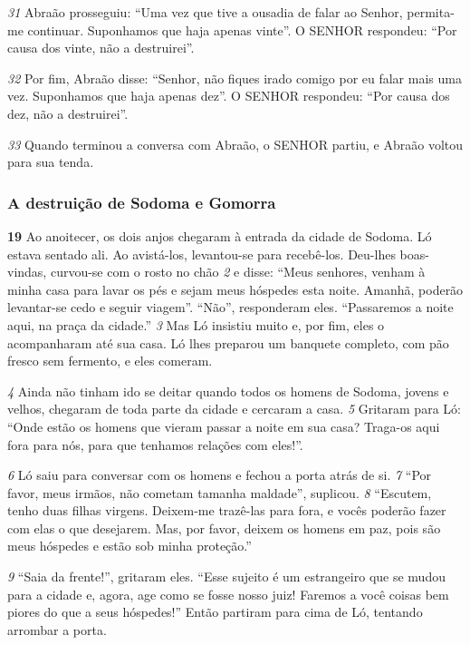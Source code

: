\bigskip   
\textit{\tiny 31}
Abraão prosseguiu: “Uma vez que tive a ousadia de falar ao Senhor, permita-
me continuar. Suponhamos que haja apenas vinte”.
   O SENHOR respondeu: “Por causa dos vinte, não a destruirei”.

\bigskip   
\textit{\tiny 32}
Por fim, Abraão disse: “Senhor, não fiques irado comigo por eu falar mais
uma vez. Suponhamos que haja apenas dez”.
   O SENHOR respondeu: “Por causa dos dez, não a destruirei”.

\bigskip   
\textit{\tiny 33}
Quando terminou a conversa com Abraão, o SENHOR partiu, e Abraão voltou
para sua tenda.
   
\bigskip   
\subsubsection*{A destruição de Sodoma e Gomorra}
\textbf{\large 19}
 Ao anoitecer, os dois anjos chegaram à entrada da cidade de Sodoma. Ló
estava sentado ali. Ao avistá-los, levantou-se para recebê-los. Deu-lhes boas-vindas, curvou-se com o rosto no chão 
\textit{\tiny 2}
e disse: “Meus senhores, venham à minha
casa para lavar os pés e sejam meus hóspedes esta noite. Amanhã, poderão
levantar-se cedo e seguir viagem”.
   “Não”, responderam eles. “Passaremos a noite aqui, na praça da cidade.”
\textit{\tiny 3}
Mas Ló insistiu muito e, por fim, eles o acompanharam até sua casa. Ló lhes
preparou um banquete completo, com pão fresco sem fermento, e eles comeram.

\bigskip   
\textit{\tiny 4}
Ainda não tinham ido se deitar quando todos os homens de Sodoma, jovens e
velhos, chegaram de toda parte da cidade e cercaram a casa. 
\textit{\tiny 5}
Gritaram para Ló:
“Onde estão os homens que vieram passar a noite em sua casa? Traga-os aqui fora
para nós, para que tenhamos relações com eles!”.

\bigskip   
\textit{\tiny 6}
Ló saiu para conversar com os homens e fechou a porta atrás de si. 
\textit{\tiny 7}
“Por favor, meus irmãos, não cometam tamanha maldade”, suplicou. 
\textit{\tiny 8}
“Escutem, tenho
duas filhas virgens. Deixem-me trazê-las para fora, e vocês poderão fazer com
elas o que desejarem. Mas, por favor, deixem os homens em paz, pois são meus
hóspedes e estão sob minha proteção.”

\bigskip   
\textit{\tiny 9}
“Saia da frente!”, gritaram eles. “Esse sujeito é um estrangeiro que se mudou
para a cidade e, agora, age como se fosse nosso juiz! Faremos a você coisas bem
piores do que a seus hóspedes!” Então partiram para cima de Ló, tentando
arrombar a porta.

